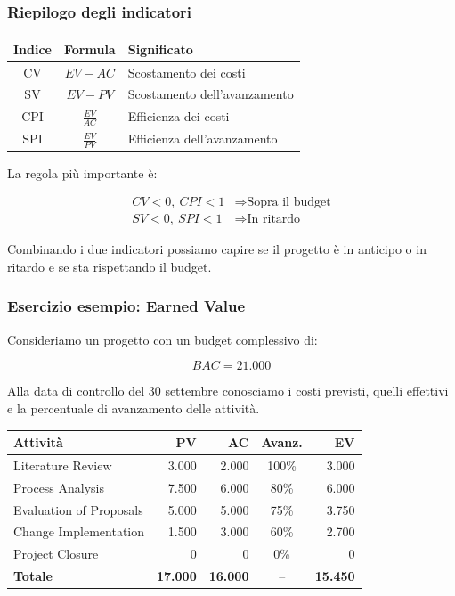 \subsubsection*{Riepilogo degli indicatori}

\begin{center}
\begin{tabular}{|c|c|p{6cm}|}
\hline
\textbf{Indice} &
\textbf{Formula} &
\textbf{Significato} \\
\hline
CV & $EV-AC$ &
Scostamento dei costi \\
\hline
SV & $EV-PV$ &
Scostamento dell'avanzamento \\
\hline
CPI & $\frac{EV}{AC}$ &
Efficienza dei costi \\
\hline
SPI & $\frac{EV}{PV}$ &
Efficienza dell'avanzamento \\
\hline
\end{tabular}
\end{center}

\noindent La regola più importante è:

\[
\boxed{
\begin{aligned}
CV<0,\ CPI<1
&\Rightarrow\text{Sopra il budget}\\
SV<0,\ SPI<1
&\Rightarrow\text{In ritardo}
\end{aligned}
}
\]

\noindent Combinando i due indicatori
possiamo capire se il progetto
è in anticipo o in ritardo
e se sta rispettando il budget.


\subsubsection*{Esercizio esempio: Earned Value}

\noindent Consideriamo un progetto
con un budget complessivo di:

\[
\boxed{BAC=21.000}
\]

\noindent Alla data di controllo
del 30 settembre conosciamo
i costi previsti, quelli effettivi
e la percentuale di avanzamento
delle attività.

\begin{center}
\scriptsize
\begin{tabular}{|p{3.5cm}|r|r|c|r|}
\hline
\textbf{Attività} &
\textbf{PV} &
\textbf{AC} &
\textbf{Avanz.} &
\textbf{EV} \\
\hline
Literature Review & 3.000 & 2.000 & 100\% & 3.000 \\
\hline
Process Analysis & 7.500 & 6.000 & 80\% & 6.000 \\
\hline
Evaluation of Proposals & 5.000 & 5.000 & 75\% & 3.750 \\
\hline
Change Implementation & 1.500 & 3.000 & 60\% & 2.700 \\
\hline
Project Closure & 0 & 0 & 0\% & 0 \\
\hline
\textbf{Totale} &
\textbf{17.000} &
\textbf{16.000} &
-- &
\textbf{15.450} \\
\hline
\end{tabular}
\end{center}

